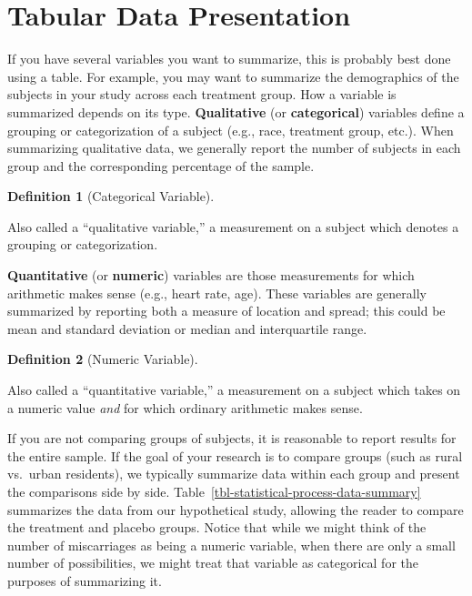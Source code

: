 \documentclass[
  letterpaper,
  DIV=11,
  numbers=noendperiod]{scrreprt}
\theoremstyle{definition}
\theoremstyle{definition}
\newtheorem{definition}{Definition}[chapter]
\theoremstyle{remark}
\begin{document}
\hypertarget{tabular-data-presentation}{%
\section{Tabular Data Presentation}\label{tabular-data-presentation}}

If you have several variables you want to summarize, this is probably
best done using a table. For example, you may want to summarize the
demographics of the subjects in your study across each treatment group.
How a variable is summarized depends on its type. \textbf{Qualitative}
(or \textbf{categorical}) variables define a grouping or categorization
of a subject (e.g., race, treatment group, etc.). When summarizing
qualitative data, we generally report the number of subjects in each
group and the corresponding percentage of the sample.

\begin{definition}[Categorical
Variable]\protect\hypertarget{def-categorical-variable}{}\label{def-categorical-variable}

Also called a ``qualitative variable,'' a measurement on a subject which
denotes a grouping or categorization.

\end{definition}

\textbf{Quantitative} (or \textbf{numeric}) variables are those
measurements for which arithmetic makes sense (e.g., heart rate, age).
These variables are generally summarized by reporting both a measure of
location and spread; this could be mean and standard deviation or median
and interquartile range.

\begin{definition}[Numeric
Variable]\protect\hypertarget{def-numeric-variable}{}\label{def-numeric-variable}

Also called a ``quantitative variable,'' a measurement on a subject
which takes on a numeric value \emph{and} for which ordinary arithmetic
makes sense.

\end{definition}

If you are not comparing groups of subjects, it is reasonable to report
results for the entire sample. If the goal of your research is to
compare groups (such as rural vs.~urban residents), we typically
summarize data within each group and present the comparisons side by
side. Table~\ref{tbl-statistical-process-data-summary} summarizes the
data from our hypothetical study, allowing the reader to compare the
treatment and placebo groups. Notice that while we might think of the
number of miscarriages as being a numeric variable, when there are only
a small number of possibilities, we might treat that variable as
categorical for the purposes of summarizing it.
\end{document}
